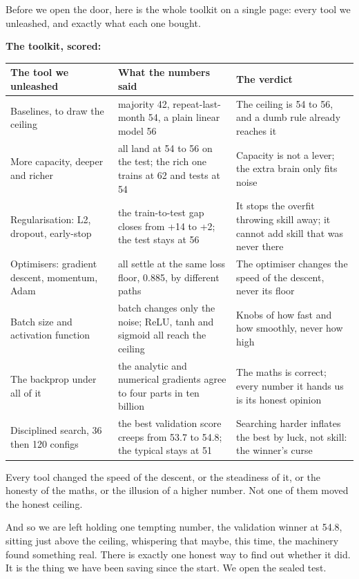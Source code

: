 \documentclass[11pt]{article} %
\begin{document}
Before we open the door, here is the whole toolkit on a single page: every tool we unleashed, and exactly what each one bought.

\textbf{The toolkit, scored:}

\begin{center}
\begin{tabular}{lll}
\hline
The tool we unleashed & What the numbers said & The verdict \\
\hline
Baselines, to draw the ceiling & majority 42, repeat-last-month 54, a plain linear model 56 & The ceiling is 54 to 56, and a dumb rule already reaches it \\
More capacity, deeper and richer & all land at 54 to 56 on the test; the rich one trains at 62 and tests at 54 & Capacity is not a lever; the extra brain only fits noise \\
Regularisation: L2, dropout, early-stop & the train-to-test gap closes from +14 to +2; the test stays at 56 & It stops the overfit throwing skill away; it cannot add skill that was never there \\
Optimisers: gradient descent, momentum, Adam & all settle at the same loss floor, 0.885, by different paths & The optimiser changes the speed of the descent, never its floor \\
Batch size and activation function & batch changes only the noise; ReLU, tanh and sigmoid all reach the ceiling & Knobs of how fast and how smoothly, never how high \\
The backprop under all of it & the analytic and numerical gradients agree to four parts in ten billion & The maths is correct; every number it hands us is its honest opinion \\
Disciplined search, 36 then 120 configs & the best validation score creeps from 53.7 to 54.8; the typical stays at 51 & Searching harder inflates the best by luck, not skill: the winner's curse \\
\hline
\end{tabular}
\end{center}


Every tool changed the speed of the descent, or the steadiness of it, or the honesty of the maths, or the illusion of a higher number. Not one of them moved the honest ceiling.

And so we are left holding one tempting number, the validation winner at 54.8, sitting just above the ceiling, whispering that maybe, this time, the machinery found something real. There is exactly one honest way to find out whether it did. It is the thing we have been saving since the start. We open the sealed test.
\end{document}
